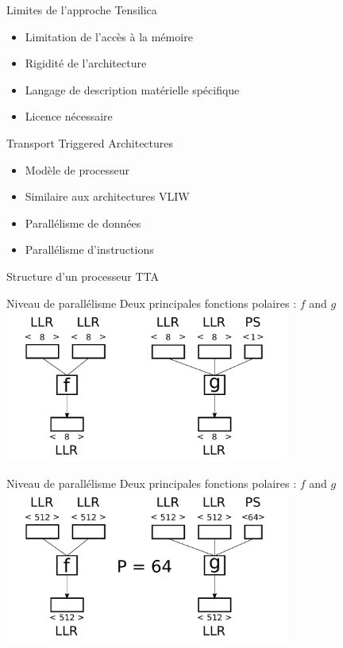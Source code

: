 \begin{frame}[c]{Limites de l'approche Tensilica}
  \begin{itemize}
    \vfill
    \item Limitation de l'accès à la mémoire
    \vfill
    \item Rigidité de l'architecture
    \vfill
    \item Langage de description matérielle spécifique
    \vfill
    \item Licence nécessaire
    \vfill
  \end{itemize}
\end{frame}

\begin{frame}[c]{Transport Triggered Architectures}
  \begin{itemize}
    \vfill
    \item Modèle de processeur
    \vfill
    \item Similaire aux architectures VLIW
    \vfill
    \item Parallélisme de données
    \vfill
    \item Parallélisme d'instructions
    \vfill
  \end{itemize}
\end{frame}

\begin{frame}[c]{Structure d'un processeur TTA}
\centering
\end{frame}

\begin{frame}[c]{Niveau de parallélisme}
  \centering
  \vfill
  Deux principales fonctions polaires : $f$ and $g$
  \vfill
  \includegraphics[width=0.7\textwidth]{fig/f_g_dimensions_scalar}
  \vfill
\end{frame}

\begin{frame}[c]{Niveau de parallélisme}
  \centering
  \vfill
  Deux principales fonctions polaires : $f$ and $g$
  \vfill
  \includegraphics[width=0.7\textwidth]{fig/f_g_dimensions_vector}
  \vfill
\end{frame}

